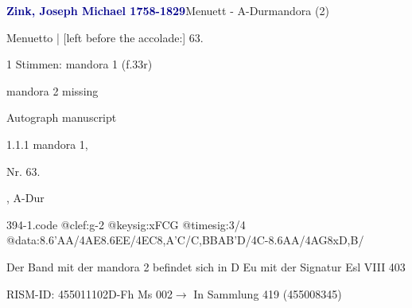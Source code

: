 \documentclass[twocolumn, 12pt]{book}
\begin{document}
\par \vspace{16pt} \textcolor{darkblue}{\textbf{Zink, Joseph Michael  1758-1829}}\hfillplus{\textbf{[394]}}\newline Menuett - A-Dur\newline mandora (2)
\par \begin{itshape}[f.33r, at left:] Menuetto | [left before the accolade:] 63.\end{itshape} 
\par \textcolor{darkblue}{}  1 Stimmen: mandora 1  (f.33r)\newline \begin{small} mandora 2 missing\end{small} \newline Autograph manuscript
\par 1.1.1  mandora 1, \begin{itshape}Nr. 63.\end{itshape}, A-Dur  
\begin{filecontents*}{394-1.code}
@clef:g-2
@keysig:xFCG
@timesig:3/4
@data:{8.6'AA}/4AE{8.6EE}/4EC{8,A'C}/C,BBA{B'D}/4C-{8.6AA}/4AG{8xD,B}/
\end{filecontents*}
\newline %
\par Der Band mit der mandora 2 befindet sich in D Eu mit der Signatur Esl VIII 403
\par RISM-ID: 455011102\newline D-Fh  Ms 002\newline $\rightarrow$ In Sammlung 419 (455008345)
      
\end{document}
